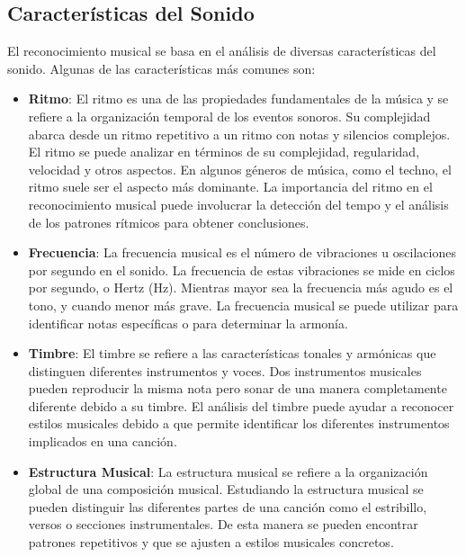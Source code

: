 \subsection{Características del Sonido}

El reconocimiento musical se basa en el análisis de diversas características del sonido. Algunas de las características más comunes son:

\begin{itemize}
\item \textbf{Ritmo}: El ritmo es una de las propiedades fundamentales de la música y se refiere a la organización temporal de los eventos sonoros. Su complejidad abarca desde un ritmo repetitivo a un ritmo con notas y silencios complejos.
El ritmo se puede analizar en términos de su complejidad, regularidad, velocidad y otros aspectos. En algunos géneros de música, como el techno, el ritmo suele ser el aspecto más dominante.
La importancia del ritmo en el reconocimiento musical puede involucrar la detección del tempo y el análisis de los patrones rítmicos para obtener conclusiones.

\item \textbf{Frecuencia}: La frecuencia musical es el número de vibraciones u oscilaciones por segundo en el sonido. 
La frecuencia de estas vibraciones se mide en ciclos por segundo, o Hertz (Hz). Mientras mayor sea la frecuencia más agudo es el tono, y cuando menor más grave.
La frecuencia musical se puede utilizar para identificar notas específicas o para determinar la armonía.

\item \textbf{Timbre}: El timbre se refiere a las características tonales y armónicas que distinguen diferentes instrumentos y voces. 
Dos instrumentos musicales pueden reproducir la misma nota pero sonar de una manera completamente diferente debido a su timbre.
El análisis del timbre puede ayudar a reconocer estilos musicales debido a que permite identificar los diferentes instrumentos implicados en una canción.

\item \textbf{Estructura Musical}: La estructura musical se refiere a la organización global de una composición musical.
Estudiando la estructura musical se pueden distinguir las diferentes partes de una canción como el estribillo, versos o secciones instrumentales. De esta manera se pueden encontrar patrones repetitivos y que se ajusten a estilos musicales concretos.
\end{itemize}

